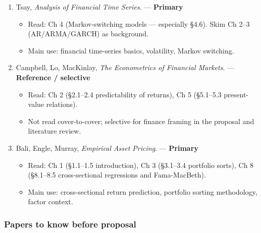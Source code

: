 \begin{enumerate}
  \begin{itemize}
  \tightlist
  \item
    Read: Ch 2 (financial data structures), Ch 3 (labeling), Ch 4
    (sample weights), Ch 7 (cross-validation in finance).
  \item
    Main use: purged validation, embargoing, backtest overfitting,
    financial ML methodology.
  \item
    Local file:
    \texttt{Books/advances-in-financial-machine-learning-1nbsped-9781119482109-9781119482116-9781119482086.pdf}.
  \end{itemize}
\item
  Tsay, \emph{Analysis of Financial Time Series}. --- \textbf{Primary}

  \begin{itemize}
  \tightlist
  \item
    Read: Ch 4 (Markov-switching models --- especially §4.6). Skim Ch
    2--3 (AR/ARMA/GARCH) as background.
  \item
    Main use: financial time-series basics, volatility, Markov
    switching.
  \end{itemize}
\item
  Campbell, Lo, MacKinlay, \emph{The Econometrics of Financial Markets}.
  --- \textbf{Reference / selective}

  \begin{itemize}
  \tightlist
  \item
    Read: Ch 2 (§2.1--2.4 predictability of returns), Ch 5 (§5.1--5.3
    present-value relations).
  \item
    Not read cover-to-cover; selective for finance framing in the
    proposal and literature review.
  \end{itemize}
\item
  Bali, Engle, Murray, \emph{Empirical Asset Pricing}. ---
  \textbf{Primary}

  \begin{itemize}
  \tightlist
  \item
    Read: Ch 1 (§1.1--1.5 introduction), Ch 3 (§3.1--3.4 portfolio
    sorts), Ch 8 (§8.1--8.5 cross-sectional regressions and
    Fama-MacBeth).
  \item
    Main use: cross-sectional return prediction, portfolio sorting
    methodology, factor context.
  \end{itemize}
\end{enumerate}

\subsubsection{Papers to know before
proposal}\label{papers-to-know-before-proposal}

